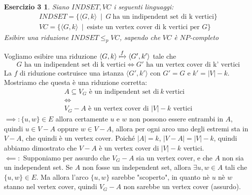 \newtheorem*{exc3}{Esercizio 3}
\begin{exc3}
Siano $INDSET, VC$ i seguenti linguaggi:
\begin{gather*}
	INDSET = \{\langle G,k \rangle  \ \mid  \ G \ \text{ha un indipendent set di k vertici}\} \\
	VC = \{\langle G, k \rangle  \ \mid  \ \text{esiste un vertex cover di k vertici per } G\}
\end{gather*}
Esibire una riduzione $INDSET \leq_p VC$, sapendo che $VC$ è $NP$-completo
\end{exc3}
Vogliamo esibire una riduzione $\langle G,k \rangle  \xmapsto{f} \langle G', k' \rangle $ tale che 
\[
	G \text{ ha un indipendent set di k vertici} \iff G' \text{ ha un vertex cover di k' vertici}
\]
La $f$ di riduzione costruisce una istanza $\langle G', k' \rangle$ con $G'=G$ e $k'=|V|-k$. Mostriamo che questa è una riduzione corretta:
\begin{gather*}
	A \subseteq V_G \text{ è un indipendent set di} \  k \ \text{vertici } \\
	\iff \\
	V_G-A \text{ è un vertex cover di } |V|-k \text{ vertici}
\end{gather*}
$\implies: \{u,w\} \in E$ allora certamente $u$ e $w$ non possono essere entrambi in $A$, quindi $u \in V-A$ oppure $w \in V-A$, allora per ogni arco uno degli estremi sta in $V-A$, che quindi è un vertex cover. Poiché $|A| = k$, $|V-A| = |V|-k$, quindi abbiamo dimostrato che $V-A$ è un vertex cover di $|V| - k$ vertici.
\\
$\impliedby: $ Supponiamo per assurdo che $V_G - A$ sia un vertex cover, e che $A$ non sia un independent set. Se $A$ non fosse un independent set, allora $\exists u, w \in A$ tali che $\{u, w\} \in E$. Ma allora l'arco $\{u, w\}$ sarebbe "scoperto", in quanto nè $u$ nè $w$ stanno nel vertex cover, quindi $V_G - A$ non sarebbe un vertex cover (assurdo).